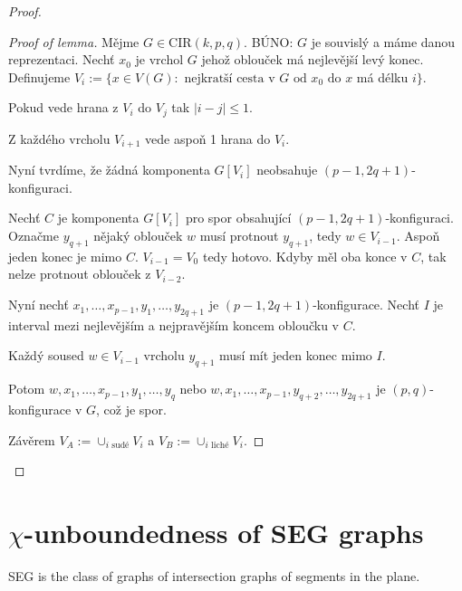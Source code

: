 \begin{proof}
	\begin{proof}[Proof of lemma]
		Mějme $G \in \text{CIR}(k,p,q)$. BÚNO: $G$ je souvislý a máme danou reprezentaci. Nechť $x_0$ je vrchol $G$ jehož oblouček má nejlevější levý konec. Definujeme $V_i := \{x \in V(G) : \text{ nejkratší cesta v } G \text{ od } x_0 \text{ do } x$ má délku $i\}$.
		
		\begin{observ}
			Pokud vede hrana z $V_i$ do $V_j$ tak $|i - j| \leq 1$.
		\end{observ}
		
		\begin{observ}
			Z každého vrcholu $V_{i+1}$ vede aspoň 1 hrana do $V_i$.
		\end{observ}
		
		Nyní tvrdíme, že žádná komponenta $G[V_i]$ neobsahuje $(p-1, 2q + 1)$-konfiguraci.
		
		Nechť $C$ je komponenta $G[V_i]$ pro spor obsahující $(p-1, 2q + 1)$-konfiguraci. Označme $y_{q+1}$ nějaký oblouček $w$ musí protnout $y_{q+1}$, tedy $w \in V_{i-1}$. Aspoň jeden konec je mimo $C$. $V_{i-1} = V_0$ tedy hotovo. Kdyby měl oba konce v $C$, tak nelze protnout oblouček z $V_{i-2}$.
		
		Nyní nechť $x_1, \dots, x_{p-1}, y_{1}, \dots, y_{2q+1}$ je $(p-1, 2q + 1)$-konfigurace. Nechť $I$ je interval mezi nejlevějším a nejpravějším koncem obloučku v $C$.
		
		\begin{observ}
			Každý soused $w \in V_{i-1}$ vrcholu $y_{q+1}$ musí mít jeden konec mimo $I$.
		\end{observ}
		
		Potom $w, x_1, \dots, x_{p-1}, y_{1}, \dots, y_q$ nebo $w, x_1, \dots, x_{p-1}, y_{q+2}, \dots, y_{2q+1}$ je $(p,q)$-konfigurace v $G$, což je spor.
		
		Závěrem $V_{A} := \cup_{i \text{ sudé}} V_{i}$ a $V_{B} := \cup_{i \text{ liché}} V_{i}$.
	\end{proof}
\end{proof}

\section{$\chi$-unboundedness of SEG graphs}

\begin{defn}
	SEG is the class of graphs of intersection graphs of segments in the plane.
\end{defn}

